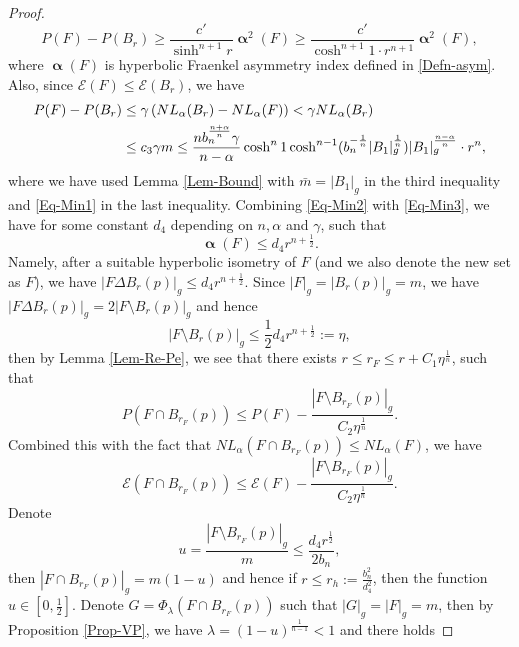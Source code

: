 \documentclass[11pt,reqno]{amsart}
\theoremstyle{definition}
\theoremstyle{remark}
\numberwithin{equation}{section}
\renewcommand{\(}{\left(}
\renewcommand{\)}{\right)}
\renewcommand{\-}{\overline}
\begin{document}
\begin{proof}
\begin{equation}
		P(F)-P(B_r)\geq \frac{c'}{\sinh^{n+1} r}\bm{\upalpha}^2(F)\geq \frac{c'}{\cosh^{n+1}1\cdot r^{n+1}}\bm{\upalpha}^2(F),
	\end{equation}
	where $\bm{\upalpha}(F)$ is hyperbolic Fraenkel asymmetry index defined in \eqref{Defn-asym}. 	Also, since $\mathcal{E}(F)\leq\mathcal{E}(B_r)$, we have
	\begin{align}
		P(F)-P(B_r)&\leq \gamma\left(NL_{\alpha}(B_r)-NL_{\alpha}(F)\right)<\gamma NL_{\alpha}(B_r)\notag\\
		&\leq c_3\gamma m\leq \frac{n b_n^{\frac{n+\alpha}{n}}\gamma}{n-\alpha}\cosh^n 1\cosh^{n-1}(b_n^{-\frac{1}{n}}|B_1|_g^{\frac{1}{n}})|B_1|_g^{\frac{n-\alpha}{n}}\cdot r^n,\label{Eq-Min3}
	\end{align}
	where we have used Lemma \ref{Lem-Bound} with $\bar{m}=|B_1|_g$ in the third inequality and \eqref{Eq-Min1} in the last inequality.  Combining \eqref{Eq-Min2} with \eqref{Eq-Min3}, we have for some constant $d_4$ depending on $n,\alpha$ and $\gamma$, such that
	\begin{equation}\label{Eq-Min4}
  \bm{\upalpha}(F)\leq d_4 r^{n+\frac{1}{2}}.
	\end{equation}
	Namely, after a suitable hyperbolic isometry of $F$ (and we also denote the new set as $F$), we have $|F\Delta B_r(p)|_g\leq d_4 r^{n+\frac{1}{2}}$. Since $|F|_g=|B_r(p)|_g=m$, we have $|F\Delta B_r(p)|_g=2|F\setminus B_r(p)|_g$ and hence
	\begin{equation}\label{Eq-Min5}
		|F\setminus B_r(p)|_g\leq\frac{1}{2}d_4 r^{n+\frac{1}{2}}:=\eta,
	\end{equation}
	then by Lemma \ref{Lem-Re-Pe}, we see that there exists $r\leq r_{F}\leq r+C_1\eta^{\frac{1}{n}}$, such that 
	\begin{equation*}
		P(F\cap B_{r_F}(p))\leq P(F)-\frac{|F\setminus B_{r_F}(p)|_g}{C_2\eta^{\frac{1}{n}}}.
	\end{equation*}
Combined this with the fact that $NL_{\alpha}(F\cap B_{r_F}(p))\leq NL_{\alpha}(F)$, we have
\begin{equation}\label{Eq-Min6}
		\mathcal{E}(F\cap B_{r_F}(p))\leq \mathcal{E}(F)-\frac{|F\setminus B_{r_F}(p)|_g}{C_2\eta^{\frac{1}{n}}}.
\end{equation}
Denote 
\begin{equation}\label{Eq-Min7}
	u=\frac{|F\setminus B_{r_F}(p)|_g}{m}\leq\frac{d_4 r^{\frac{1}{2}}}{2b_n},
\end{equation}
then $|F\cap B_{r_F}(p)|_g=m(1-u)$ and hence if $r\leq r_{h}:=\frac{b_n^2}{d_4^2}$, then the function $u\in[0,\frac{1}{2}]$. Denote $G=\Phi_{\lambda}(F\cap B_{r_F}(p))$ such that $|G|_g=|F|_g=m$, then by Proposition \ref{Prop-VP}, we have $\lambda=(1-u)^{\frac{1}{n-1}}<1$ and there holds 

\end{proof}
\end{document}
